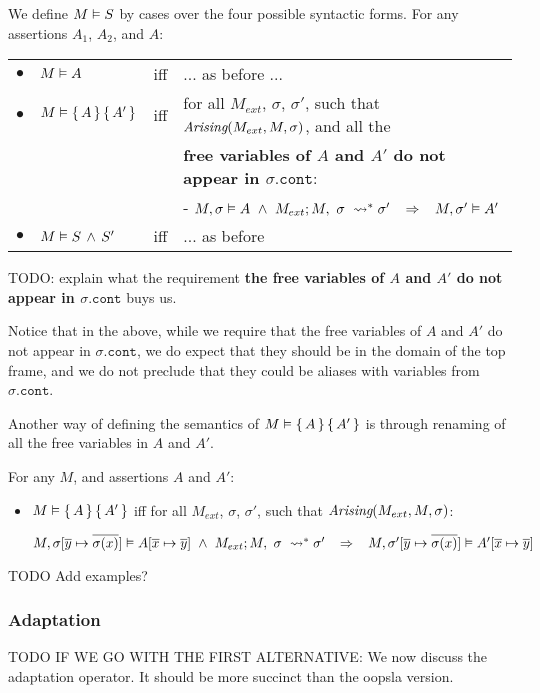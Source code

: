 \begin{definition}
We define $M \vDash {S}$ by cases over the four possible syntactic forms.
For any assertions   $A_1$, $A_2$, and $A$: \\

\label{def:necessity-semantics}

\begin{tabular}{llcl}
$\bullet$ & $M \vDash {A}$& iff & ... as before ... \\
$\bullet$ &  $M \vDash {\{}\, A \,{\}} \, {\{}\, A'\, {\}} $ &  iff   &  for all $M_{ext}$, $\sigma$, $\sigma'$, such that $\textit{Arising}(M_{ext}, M, \sigma)$, and all the \\
& & & {\textbf {free variables of $A$ and $A'$ do not appear in $\sigma.{\texttt{cont}}$}}: \\  
 & & & -   $\satisfiesA{M}{\sigma}{A}\  \wedge \ \reductions{M_{ext}}{M}{\sigma}{\sigma'} \;\;\;\Rightarrow\;\;\; \satisfiesA{M}{\sigma'}{A'}$   
\\
$\bullet$ &  $M \vDash S\, \wedge\, S'$ &   iff   & ... as before 
\end{tabular} 

TODO: explain what the requirement {\textbf {the free variables of $A$ and $A'$ do not appear in $\sigma.{\texttt{cont}}$}} buys us. 

Notice that in the above, while we require that the free variables of $A$ and $A'$ do not appear in $\sigma.{\texttt{cont}}$, we do expect that they should be in the domain of the top frame, and we do not preclude that they could be aliases with variables from 
$\sigma.{\texttt{cont}}$.

Another way of defining the semantics of $M \vDash {\{}\, A \,{\}} \, {\{}\, A'\, {\}} $  is through renaming of all the free variables in $A$ and $A'$.

\begin{lemma}
For any $M$, and assertions $A$ and $A'$:

\begin{itemize}
\item $M \vDash {\{}\, A \,{\}} \, {\{}\, A'\, {\}} $ iff for all $M_{ext}$, $\sigma$, $\sigma'$, such that $\textit{Arising}(M_{ext}, M, \sigma)$: 
\\
\strut \hspace{0.1cm} $M , \sigma[\overline y \mapsto \overline {\sigma (x)}] \vDash A [\overline x \mapsto \overline {y}]
\  \wedge \ M_{ext} ; M,\ \sigma\ \leadsto^* \sigma' \;\;\;\Rightarrow\;\;\; M , \sigma'[\overline y \mapsto \overline {\sigma (x)}] \vDash A'[\overline x \mapsto \overline {y}]$
\end{itemize} 
\end{lemma}

 
\end{definition} 

TODO Add examples?


\subsubsection{Adaptation}
\label{sub:adapt:full}
TODO IF WE GO WITH THE FIRST ALTERNATIVE: We  now discuss  the adaptation operator.  It should be more succinct than the oopsla version.
 


